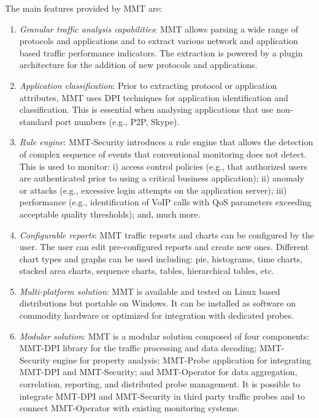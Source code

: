  The main features provided by {MMT} are:
\begin{enumerate}
\item
\textit{Granular traffic analysis capabilities}: MMT allows parsing a wide range of protocols and applications and to extract various network and application based traffic performance indicators. The extraction is powered by a plugin architecture for the addition of new protocols and applications.

\item
\textit{Application classification}: Prior to extracting protocol or application attributes, MMT uses DPI techniques for application identification and classification. This is essential when analysing applications that use non-standard port numbers (e.g., P2P, Skype). 

\item
\textit{Rule engine}: MMT-Security introduces a rule engine that allows the detection of complex sequence of events that conventional monitoring does not detect. This is used to monitor: i) access control policies (e.g., that authorized users are authenticated prior to using a critical business application); ii) anomaly or attacks (e.g., excessive login attempts on the application server); iii) performance (e.g., identification of VoIP calls with QoS parameters exceeding acceptable quality thresholds); and, much more.

\item
\textit{Configurable reports}: MMT traffic reports and charts can be configured by the user. The user can edit pre-configured reports and create new ones. Different chart types and graphs can be used including: pie, histograms, time charts, stacked area charts, sequence charts, tables, hierarchical tables, etc.

\item
\textit{Multi-platform solution}: MMT is available and tested on Linux based distributions but portable on Windows. It can be installed as software on commodity hardware or optimized for integration with dedicated probes.

\item
\textit{Modular solution}: MMT is a modular solution composed of four components: MMT-DPI library for the traffic processing and data decoding; MMT-Security engine for property analysis; MMT-Probe application for integrating MMT-DPI and MMT-Security; and MMT-Operator for data aggregation, correlation, reporting, and distributed probe management. It is possible to integrate MMT-DPI and MMT-Security in third party traffic probes and to connect MMT-Operator with existing monitoring systems.
\end{enumerate}


